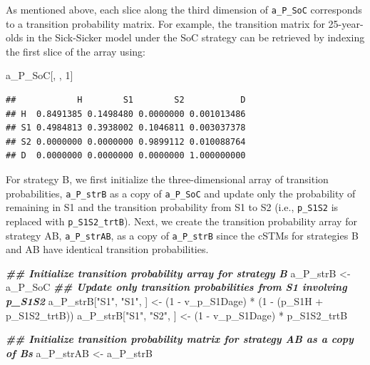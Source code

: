 \documentclass[
]{article}
\newenvironment{Shaded}{\begin{snugshade}}{\end{snugshade}}
\newcommand{\DecValTok}[1]{\textcolor[rgb]{0.00,0.00,0.81}{#1}}
\newcommand{\DocumentationTok}[1]{\textcolor[rgb]{0.56,0.35,0.01}{\textbf{\textit{#1}}}}
\newcommand{\NormalTok}[1]{#1}
\newcommand{\OtherTok}[1]{\textcolor[rgb]{0.56,0.35,0.01}{#1}}
\newcommand{\SpecialCharTok}[1]{\textcolor[rgb]{0.00,0.00,0.00}{#1}}
\newcommand{\StringTok}[1]{\textcolor[rgb]{0.31,0.60,0.02}{#1}}
\begin{document}
As mentioned above, each slice along the third dimension of \texttt{a\_P\_SoC} corresponds to a transition probability matrix. For example, the transition matrix for 25-year-olds in the Sick-Sicker model under the SoC strategy can be retrieved by indexing the first slice of the array using:

\begin{Shaded}
\begin{Highlighting}[]
\NormalTok{a\_P\_SoC[, , }\DecValTok{1}\NormalTok{]}
\end{Highlighting}
\end{Shaded}

\begin{verbatim}
##            H        S1        S2           D
## H  0.8491385 0.1498480 0.0000000 0.001013486
## S1 0.4984813 0.3938002 0.1046811 0.003037378
## S2 0.0000000 0.0000000 0.9899112 0.010088764
## D  0.0000000 0.0000000 0.0000000 1.000000000
\end{verbatim}

For strategy B, we first initialize the three-dimensional array of transition probabilities, \texttt{a\_P\_strB} as a copy of \texttt{a\_P\_SoC} and update only the probability of remaining in S1 and the transition probability from S1 to S2 (i.e., \texttt{p\_S1S2} is replaced with \texttt{p\_S1S2\_trtB}). Next, we create the transition probability array for strategy AB, \texttt{a\_P\_strAB}, as a copy of \texttt{a\_P\_strB} since the cSTMs for strategies B and AB have identical transition probabilities.

\begin{Shaded}
\begin{Highlighting}[]
\DocumentationTok{\#\# Initialize transition probability array for strategy B}
\NormalTok{a\_P\_strB }\OtherTok{\textless{}{-}}\NormalTok{ a\_P\_SoC}
\DocumentationTok{\#\# Update only transition probabilities from S1 involving p\_S1S2}
\NormalTok{a\_P\_strB[}\StringTok{"S1"}\NormalTok{, }\StringTok{"S1"}\NormalTok{, ] }\OtherTok{\textless{}{-}}\NormalTok{ (}\DecValTok{1} \SpecialCharTok{{-}}\NormalTok{ v\_p\_S1Dage) }\SpecialCharTok{*}\NormalTok{ (}\DecValTok{1} \SpecialCharTok{{-}}\NormalTok{ (p\_S1H }\SpecialCharTok{+}\NormalTok{ p\_S1S2\_trtB))}
\NormalTok{a\_P\_strB[}\StringTok{"S1"}\NormalTok{, }\StringTok{"S2"}\NormalTok{, ] }\OtherTok{\textless{}{-}}\NormalTok{ (}\DecValTok{1} \SpecialCharTok{{-}}\NormalTok{ v\_p\_S1Dage) }\SpecialCharTok{*}\NormalTok{ p\_S1S2\_trtB}

\DocumentationTok{\#\# Initialize transition probability matrix for strategy AB as a copy of B\textquotesingle{}s}
\NormalTok{a\_P\_strAB }\OtherTok{\textless{}{-}}\NormalTok{ a\_P\_strB}
\end{Highlighting}
\end{Shaded}
\end{document}
